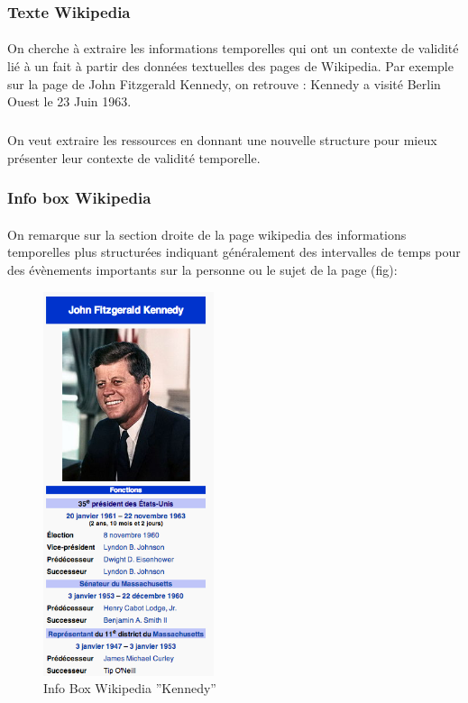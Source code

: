 \subsubsection*{Texte Wikipedia}
\paragraph{}
On cherche à extraire les informations temporelles qui ont un contexte de validité lié à un fait à partir des données textuelles des pages de Wikipedia. 
Par exemple sur la page de John Fitzgerald Kennedy, on retrouve :
\newline
Kennedy a visité Berlin Ouest le 23 Juin 1963.
\subparagraph{}
On veut extraire les ressources en donnant une nouvelle structure pour mieux présenter leur contexte de validité temporelle.
\subsubsection*{Info box Wikipedia}
\paragraph{}
On remarque sur la section droite de la page wikipedia des informations temporelles plus structurées indiquant généralement des intervalles de temps pour des évènements importants sur la personne ou le sujet de la page (fig):
\begin{figure}[H]
        \centering
                \centering
                \includegraphics[width=5cm]{kennedy.png}
               \caption{Info Box Wikipedia ''Kennedy''}

\end{figure}
